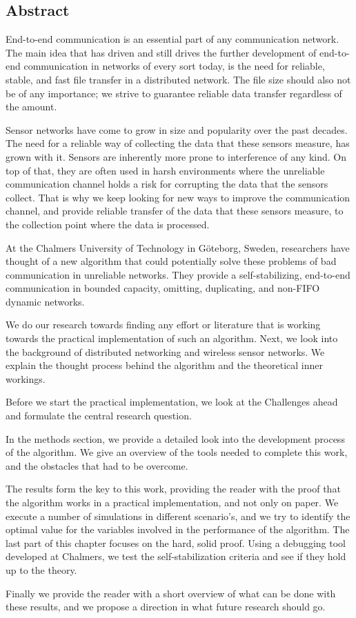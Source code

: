 \subsection{Abstract}\label{abstract}

End-to-end communication is an essential part of any communication
network. The main idea that has driven and still drives the further
development of end-to-end communication in networks of every sort today,
is the need for reliable, stable, and fast file transfer in a
distributed network. The file size should also not be of any importance;
we strive to guarantee reliable data transfer regardless of the amount.

Sensor networks have come to grow in size and popularity over the past
decades. The need for a reliable way of collecting the data that these
sensors measure, has grown with it. Sensors are inherently more prone to
interference of any kind. On top of that, they are often used in harsh
environments where the unreliable communication channel holds a risk for
corrupting the data that the sensors collect. That is why we keep
looking for new ways to improve the communication channel, and provide
reliable transfer of the data that these sensors measure, to the
collection point where the data is processed.

At the Chalmers University of Technology in Göteborg, Sweden,
researchers have thought of a new algorithm that could potentially solve
these problems of bad communication in unreliable networks. They provide
a self-stabilizing, end-to-end communication in bounded capacity,
omitting, duplicating, and non-FIFO dynamic networks.

We do our research towards finding any effort or literature that is
working towards the practical implementation of such an algorithm. Next,
we look into the background of distributed networking and wireless
sensor networks. We explain the thought process behind the algorithm and
the theoretical inner workings.

Before we start the practical implementation, we look at the Challenges
ahead and formulate the central research question.

In the methods section, we provide a detailed look into the development
process of the algorithm. We give an overview of the tools needed to
complete this work, and the obstacles that had to be overcome.

The results form the key to this work, providing the reader with the
proof that the algorithm works in a practical implementation, and not
only on paper. We execute a number of simulations in different
scenario's, and we try to identify the optimal value for the variables
involved in the performance of the algorithm. The last part of this
chapter focuses on the hard, solid proof. Using a debugging tool
developed at Chalmers, we test the self-stabilization criteria and see
if they hold up to the theory.

Finally we provide the reader with a short overview of what can be done
with these results, and we propose a direction in what future research
should go.
